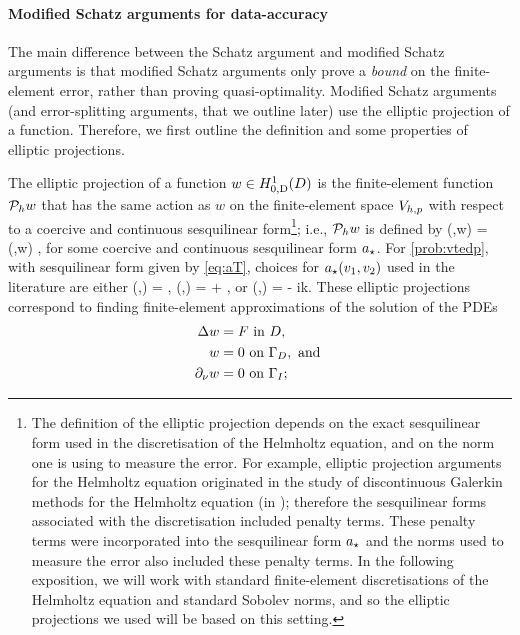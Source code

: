 \paragraph{Modified Schatz arguments for data-accuracy} The main difference between the Schatz argument and modified Schatz arguments is that modified Schatz arguments only prove a \emph{bound} on the finite-element error, rather than proving quasi-optimality. Modified Schatz arguments (and error-splitting arguments, that we outline later) use the elliptic projection of a function. Therefore, we first outline the definition and some properties of elliptic projections.



The elliptic projection of a function $ w \in \HozDD$ is the finite-element function $\mathcal P_{h} w$ that has the same action as $w$ on the finite-element space $V_{h,p}$ with respect to a coercive and continuous sesquilinear form\footnote{The definition of the elliptic projection depends on the exact sesquilinear form used in the discretisation of the Helmholtz equation, and on the norm one is using to measure the error. For example, elliptic projection arguments for the Helmholtz equation originated in the study of discontinuous Galerkin methods for the Helmholtz equation (in \cite{FeWu:09,FeWu:11}); therefore the sesquilinear forms associated with the discretisation included penalty terms. These penalty terms were incorporated into the sesquilinear form $a_{\star}$ and the norms used to measure the error also included these penalty terms. In the following exposition, we will work with standard finite-element discretisations of the Helmholtz equation and standard Sobolev norms, and so the elliptic projections we used will be based on this setting.}; i.e., $\mathcal P_{h} w$ is defined by
\beqs
\aep(\vh,\Ph w) = \aep(\vh,w) \tforall \vh \in \Vhp,
\eeqs
for some coercive and continuous sesquilinear form $a_{\star}$. For \cref{prob:vtedp}, with sesquilinear form given by \cref{eq:aT}, choices for $a_{\star}(v_{1},v_{2})$ used in the literature are either
\beq\label{eq:aepho}
\aep(\vo,\vt) = \IPLtD{\grad \vo}{\grad \vt},
\eeq
\beq\label{eq:aeplower}
\aep(\vo,\vt) = \IPLtD{\grad \vo}{\grad \vt} + \IPLtD{\vo}{\vt},
\eeq
or
\beq\label{eq:aepused}
\aep(\vo,\vt) = \IPLtD{\grad \vo}{\grad \vt} - ik\IPLtGI{\vo}{\vt}.
\eeq
These elliptic projections correspond to finding finite-element approximations of the solution of the PDEs
\begin{subequations}
  \label{eq:sda}
\begin{align}
  \Delta w &= F \text{ in } D,\label{eq:sd1}\\
  w &= 0 \text{ on } \Gamma_{D},\text{ and }\label{eq:sd2}\\
  \partial_{\nu} w &= 0 \text{ on } \Gamma_{I}\label{eq:sd3};
\end{align}
\end{subequations}
